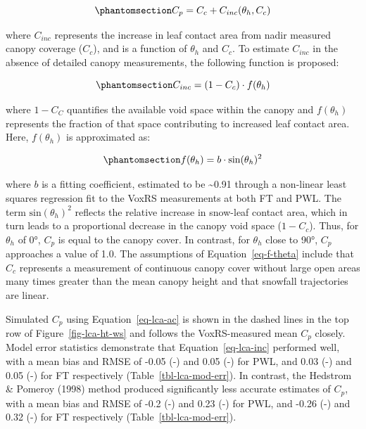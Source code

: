 \documentclass[
  letterpaper,
  DIV=11,
  numbers=noendperiod]{scrartcl}
\begin{document}
\begin{equation}\phantomsection\label{eq-lca-ac}{
C_p = C_c + C_{inc}(\theta_h, C_c)
}\end{equation}

where \(C_{inc}\) represents the increase in leaf contact area from
nadir measured canopy coverage (\(C_c\)), and is a function of
\(\theta_h\) and \(C_c\). To estimate \(C_{inc}\) in the absence of
detailed canopy measurements, the following function is proposed:

\begin{equation}\phantomsection\label{eq-lca-inc}{
C_{inc} = (1-C_c)\cdot f(\theta_h)
}\end{equation}

where \(1-C_C\) quantifies the available void space within the canopy
and \(f(\theta_h)\) represents the fraction of that space contributing
to increased leaf contact area. Here, \(f(\theta_h)\) is approximated
as:

\begin{equation}\phantomsection\label{eq-f-theta}{
f(\theta_h) = b \cdot\text{sin}(\theta_h)^2
}\end{equation}

where \(b\) is a fitting coefficient, estimated to be
\textasciitilde0.91 through a non-linear least squares regression fit to
the VoxRS measurements at both FT and PWL. The term
\(\text{sin}(\theta_h)^2\) reflects the relative increase in snow-leaf
contact area, which in turn leads to a proportional decrease in the
canopy void space (\(1-C_c\)). Thus, for \(\theta_h\) of 0°, \(C_p\) is
equal to the canopy cover. In contrast, for \(\theta_h\) close to 90°,
\(C_p\) approaches a value of 1.0. The assumptions of
Equation~\ref{eq-f-theta} include that \(C_c\) represents a measurement
of continuous canopy cover without large open areas many times greater
than the mean canopy height and that snowfall trajectories are linear.

Simulated \(C_p\) using Equation~\ref{eq-lca-ac} is shown in the dashed
lines in the top row of Figure~\ref{fig-lca-ht-ws} and follows the
VoxRS-measured mean \(C_p\) closely. Model error statistics demonstrate
that Equation~\ref{eq-lca-inc} performed well, with a mean bias and RMSE
of -0.05 (-) and 0.05 (-) for PWL, and 0.03 (-) and 0.05 (-) for FT
respectively (Table~\ref{tbl-lca-mod-err}). In contrast, the Hedstrom \&
Pomeroy (1998) method produced significantly less accurate estimates of
\(C_p\), with a mean bias and RMSE of -0.2 (-) and 0.23 (-) for PWL, and
-0.26 (-) and 0.32 (-) for FT respectively
(Table~\ref{tbl-lca-mod-err}).
\end{document}
